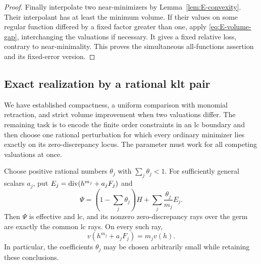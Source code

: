 \begin{proof}
Finally interpolate two near-minimizers by
Lemma~\ref{lem:E-convexity}. Their interpolant has at least the
minimum volume. If their values on some regular function differed
by a fixed factor greater than one, apply \eqref{eq:E-volume-gap},
interchanging the valuations if necessary. It gives a fixed relative
loss, contrary to near-minimality. This proves the simultaneous
all-functions assertion and its fixed-error version.
\end{proof}

\subsection{Exact realization by a rational klt pair}

We have established compactness, a uniform comparison with monomial
retraction, and strict volume improvement when two valuations differ.
The remaining task is to encode the finite order constraints in an lc
boundary and then choose one rational perturbation for which every
ordinary minimizer lies exactly on its zero-discrepancy locus.  The
parameter must work for all competing valuations at once.

\begin{lemma}\label{lem:E-slice-boundary}
Choose positive rational numbers $\theta_j$ with
$\sum_j\theta_j<1$. For sufficiently general scalars $a_j$, put
$E_j=\operatorname{div}(h^{m_j}+a_jF_j)$ and
\begin{equation}\label{eq:E-slice-boundary}
 \Psi=(1-\sum_j\theta_j)H+
                     \sum_j\frac{\theta_j}{m_j}E_j.
\end{equation}
Then $\Psi$ is effective and lc, and its nonzero zero-discrepancy
rays over the germ are exactly the common lc rays. On every such ray,
\begin{equation}\label{eq:E-pencil-order}
 v(h^{m_j}+a_jF_j)=m_jv(h).
\end{equation}
In particular, the coefficients $\theta_j$ may be chosen arbitrarily
small while retaining these conclusions.
\end{lemma}

